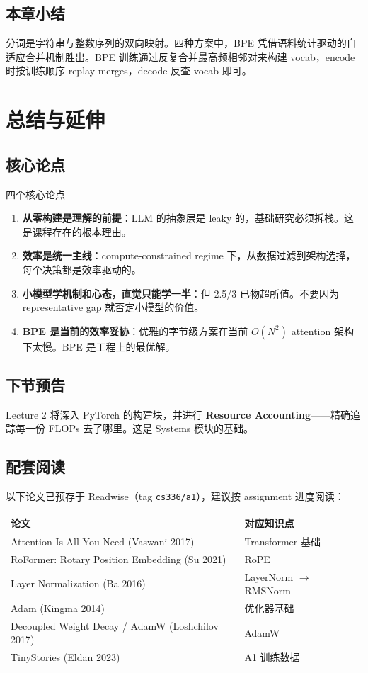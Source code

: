 \documentclass[a4paper]{article}
\begin{document}
\subsection{本章小结}

分词是字符串与整数序列的双向映射。四种方案中，BPE 凭借语料统计驱动的自适应合并机制胜出。BPE 训练通过反复合并最高频相邻对来构建 vocab，encode 时按训练顺序 replay merges，decode 反查 vocab 即可。

\section{总结与延伸}

\subsection{核心论点}

\begin{importantbox}{四个核心论点}
\begin{enumerate}
\item \textbf{从零构建是理解的前提}：LLM 的抽象层是 leaky 的，基础研究必须拆栈。这是课程存在的根本理由。
\item \textbf{效率是统一主线}：compute-constrained regime 下，从数据过滤到架构选择，每个决策都是效率驱动的。
\item \textbf{小模型学机制和心态，直觉只能学一半}：但 2.5/3 已物超所值。不要因为 representative gap 就否定小模型的价值。
\item \textbf{BPE 是当前的效率妥协}：优雅的字节级方案在当前 $O(N^2)$ attention 架构下太慢。BPE 是工程上的最优解。
\end{enumerate}
\end{importantbox}

\subsection{下节预告}

Lecture 2 将深入 PyTorch 的构建块，并进行 \textbf{Resource Accounting}——精确追踪每一份 FLOPs 去了哪里。这是 Systems 模块的基础。

\subsection{配套阅读}

以下论文已预存于 Readwise（tag \texttt{cs336/a1}），建议按 assignment 进度阅读：

\begin{tabular}{p{7cm}p{6cm}}
\toprule
\textbf{论文} & \textbf{对应知识点} \\
\midrule
Attention Is All You Need (Vaswani 2017) & Transformer 基础 \\
RoFormer: Rotary Position Embedding (Su 2021) & RoPE \\
Layer Normalization (Ba 2016) & LayerNorm $\to$ RMSNorm \\
Adam (Kingma 2014) & 优化器基础 \\
Decoupled Weight Decay / AdamW (Loshchilov 2017) & AdamW \\
TinyStories (Eldan 2023) & A1 训练数据 \\
\bottomrule
\end{tabular}

\end{document}
